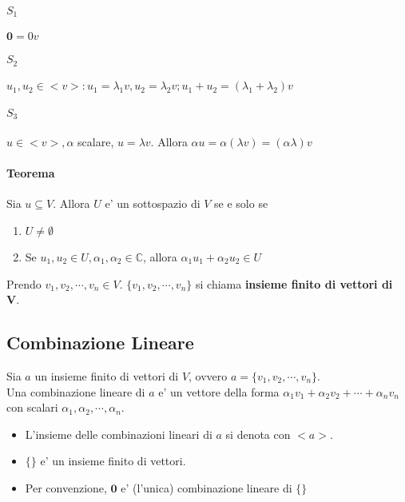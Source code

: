 \documentclass[a4paper, 10pt]{article}
\begin{document}
	\paragraph*{$S_1$} $\textbf{0} = 0v$
	\paragraph*{$S_2$} $u_1, u_2 \in <v> : u_1 = \lambda _1 v, u_2 = \lambda _2 v; u_1 + u_2 = (\lambda _1 + \lambda _2 ) v$
	\paragraph*{$S_3$} $u \in <v>, \alpha$ scalare, $u = \lambda v$. Allora $\alpha u = \alpha (\lambda v) = (\alpha \lambda ) v$
	\paragraph*{Teorema} Sia $u \subseteq V$. Allora $U$ e' un sottospazio di $V$ se e solo se 
	\begin{enumerate}
		\item $U \neq \emptyset$
		\item Se $u_1, u_2 \in U, \alpha _1 , \alpha _2 \in \mathbb{C}$, allora $\alpha _1 u_1 + \alpha _2 u_2 \in U$
	\end{enumerate}
	Prendo $v_1, v_2, \cdots, v_n \in V$. $ \lbrace v_1, v_2, \cdots, v_n \rbrace$ si chiama \textbf{insieme finito di vettori di
	V}.\\
	
	\subsection{Combinazione Lineare}
	Sia $a$ un insieme finito di vettori di $V$, ovvero $a = \lbrace v_1 , v_2 , \cdots, v_n \rbrace$. \\
	Una combinazione lineare di $a$ e' un vettore della forma $\alpha _1  v_1 + \alpha _2  v_2 + \cdots + \alpha _n  v_n$ 
	con scalari $\alpha _1 , \alpha _2 , \cdots, \alpha _n$. 
	\begin{itemize}
		\item L'insieme delle combinazioni lineari di $a$ si denota con $<a>$.
		\item $\lbrace \rbrace$ e' un insieme finito di vettori. \\
		\item Per convenzione, $\textbf{0}$ e' (l'unica) combinazione lineare di $\lbrace \rbrace$
	\end{itemize}
	
\end{document}
